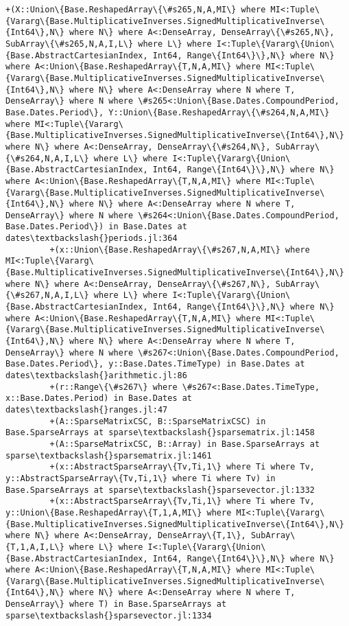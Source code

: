 \documentclass[11pt]{article}
\begin{document}
\begin{Verbatim}[commandchars=\\\{\}]
         +(X::Union\{Base.ReshapedArray\{\#s265,N,A,MI\} where MI<:Tuple\{Vararg\{Base.MultiplicativeInverses.SignedMultiplicativeInverse\{Int64\},N\} where N\} where A<:DenseArray, DenseArray\{\#s265,N\}, SubArray\{\#s265,N,A,I,L\} where L\} where I<:Tuple\{Vararg\{Union\{Base.AbstractCartesianIndex, Int64, Range\{Int64\}\},N\} where N\} where A<:Union\{Base.ReshapedArray\{T,N,A,MI\} where MI<:Tuple\{Vararg\{Base.MultiplicativeInverses.SignedMultiplicativeInverse\{Int64\},N\} where N\} where A<:DenseArray where N where T, DenseArray\} where N where \#s265<:Union\{Base.Dates.CompoundPeriod, Base.Dates.Period\}, Y::Union\{Base.ReshapedArray\{\#s264,N,A,MI\} where MI<:Tuple\{Vararg\{Base.MultiplicativeInverses.SignedMultiplicativeInverse\{Int64\},N\} where N\} where A<:DenseArray, DenseArray\{\#s264,N\}, SubArray\{\#s264,N,A,I,L\} where L\} where I<:Tuple\{Vararg\{Union\{Base.AbstractCartesianIndex, Int64, Range\{Int64\}\},N\} where N\} where A<:Union\{Base.ReshapedArray\{T,N,A,MI\} where MI<:Tuple\{Vararg\{Base.MultiplicativeInverses.SignedMultiplicativeInverse\{Int64\},N\} where N\} where A<:DenseArray where N where T, DenseArray\} where N where \#s264<:Union\{Base.Dates.CompoundPeriod, Base.Dates.Period\}) in Base.Dates at dates\textbackslash{}periods.jl:364
         +(x::Union\{Base.ReshapedArray\{\#s267,N,A,MI\} where MI<:Tuple\{Vararg\{Base.MultiplicativeInverses.SignedMultiplicativeInverse\{Int64\},N\} where N\} where A<:DenseArray, DenseArray\{\#s267,N\}, SubArray\{\#s267,N,A,I,L\} where L\} where I<:Tuple\{Vararg\{Union\{Base.AbstractCartesianIndex, Int64, Range\{Int64\}\},N\} where N\} where A<:Union\{Base.ReshapedArray\{T,N,A,MI\} where MI<:Tuple\{Vararg\{Base.MultiplicativeInverses.SignedMultiplicativeInverse\{Int64\},N\} where N\} where A<:DenseArray where N where T, DenseArray\} where N where \#s267<:Union\{Base.Dates.CompoundPeriod, Base.Dates.Period\}, y::Base.Dates.TimeType) in Base.Dates at dates\textbackslash{}arithmetic.jl:86
         +(r::Range\{\#s267\} where \#s267<:Base.Dates.TimeType, x::Base.Dates.Period) in Base.Dates at dates\textbackslash{}ranges.jl:47
         +(A::SparseMatrixCSC, B::SparseMatrixCSC) in Base.SparseArrays at sparse\textbackslash{}sparsematrix.jl:1458
         +(A::SparseMatrixCSC, B::Array) in Base.SparseArrays at sparse\textbackslash{}sparsematrix.jl:1461
         +(x::AbstractSparseArray\{Tv,Ti,1\} where Ti where Tv, y::AbstractSparseArray\{Tv,Ti,1\} where Ti where Tv) in Base.SparseArrays at sparse\textbackslash{}sparsevector.jl:1332
         +(x::AbstractSparseArray\{Tv,Ti,1\} where Ti where Tv, y::Union\{Base.ReshapedArray\{T,1,A,MI\} where MI<:Tuple\{Vararg\{Base.MultiplicativeInverses.SignedMultiplicativeInverse\{Int64\},N\} where N\} where A<:DenseArray, DenseArray\{T,1\}, SubArray\{T,1,A,I,L\} where L\} where I<:Tuple\{Vararg\{Union\{Base.AbstractCartesianIndex, Int64, Range\{Int64\}\},N\} where N\} where A<:Union\{Base.ReshapedArray\{T,N,A,MI\} where MI<:Tuple\{Vararg\{Base.MultiplicativeInverses.SignedMultiplicativeInverse\{Int64\},N\} where N\} where A<:DenseArray where N where T, DenseArray\} where T) in Base.SparseArrays at sparse\textbackslash{}sparsevector.jl:1334

\end{Verbatim}
\end{document}
